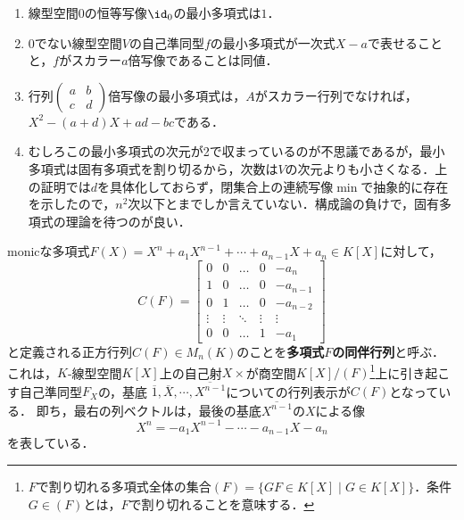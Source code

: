 \documentclass[uplatex, dvipdfmx]{jsreport}
\begin{document}
\begin{example}[最小多項式]\mbox{}
    \begin{enumerate}
        \item 線型空間$0$の恒等写像$\id_0$の最小多項式は$1$．
        \item $0$でない線型空間$V$の自己準同型$f$の最小多項式が一次式$X-a$で表せることと，$f$がスカラー$a$倍写像であることは同値．
        \item 行列$\begin{pmatrix}a&b\\c&d\end{pmatrix}$倍写像の最小多項式は，$A$がスカラー行列でなければ，$X^2-(a+d)X+ad-bc$である．
        \item むしろこの最小多項式の次元が2で収まっているのが不思議であるが，最小多項式は固有多項式を割り切るから，次数は$V$の次元よりも小さくなる．上の証明では$d$を具体化しておらず，閉集合上の連続写像$\min$で抽象的に存在を示したので，$n^2$次以下とまでしか言えていない．構成論の負けで，固有多項式の理論を待つのが良い．
    \end{enumerate}
\end{example}

\begin{definition}
    monicな多項式$F(X) = X^n+a_1X^{n-1}+\cdots +a_{n-1}X+a_n \in K[X]$に対して，
        \[C(F)=\begin{bmatrix}
        0 & 0 & \dots & 0 & -a_n \\
        1 & 0 & \dots & 0 & -a_{n-1} \\
        0 & 1 & \dots & 0 & -a_{n-2} \\
        \vdots & \vdots & \ddots & \vdots & \vdots \\
        0 & 0 & \dots & 1 & -a_1
        \end{bmatrix}\]
    と定義される正方行列$C(F)\in M_n(K)$のことを\textbf{多項式$F$の同伴行列}と呼ぶ．
    これは，$K$-線型空間$K[X]$上の自己射$X\times$が商空間$K[X]/(F)$\footnote{$F$で割り切れる多項式全体の集合$(F)=\{GF\in K[X]\mid G\in K[X]\}$．条件$G\in (F)$とは，$F$で割り切れることを意味する．}上に引き起こす自己準同型$F_X$の，基底
    $\overline{1},\overline{X},\cdots,\overline{X^{n-1}}$についての行列表示が$C(F)$となっている．
    即ち，最右の列ベクトルは，最後の基底$\overline{X^{n-1}}$の$X$による像
    \[ X^n=-a_1X^{n-1}-\cdots-a_{n-1}X-a_n \]
    を表している．
\end{definition}
\end{document}
